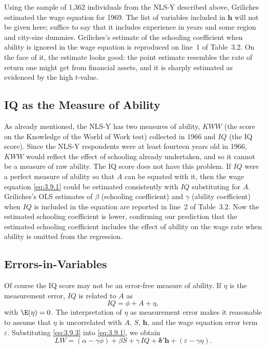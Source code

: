 Using the sample of 1,362 individuals from the NLS-Y described above,
Griliches estimated the wage equation for 1969.  The list of variables included in
$\mathbf{h}$ will not be given here; suffice to say that it includes experience in years and some
region and city-size dummies.  Griliches's estimate of the schooling coefficient
when ability is ignored in the wage equation is reproduced on line~1 of Table~3.2.
On the face of it, the estimate looks good: the point estimate resembles the rate of
return one might get from financial assets, and it is sharply estimated as evidenced
by the high $t$-value.

\subsection*{IQ as the Measure of Ability}

As already mentioned, the NLS-Y has two measures of ability, $KWW$ (the score on
the Knowledge of the World of Work test) collected in 1966 and $IQ$ (the IQ score).
Since the NLS-Y respondents were at least fourteen years old in 1966, $KWW$ would
reflect the effect of schooling already undertaken, and so it cannot be a measure of
raw ability.  The IQ score does not have this problem.  If $IQ$ were a perfect measure
of ability so that $A$ can be equated with it, then the wage equation \eqref{eq:3.9.1}
could be estimated consistently with $IQ$ substituting for $A$.  Griliches's OLS estimates
of $\beta$ (schooling coefficient) and $\gamma$ (ability coefficient) when $IQ$ is included in
the equation are reported in line~2 of Table~3.2.  Now the estimated schooling coefficient
is lower, confirming our prediction that the estimated schooling coefficient includes
the effect of ability on the wage rate when ability is omitted from the regression.

\subsection*{Errors-in-Variables}

Of course the IQ score may not be an error-free measure of ability.  If $\eta$ is the
measurement error, $IQ$ is related to $A$ as
\begin{equation}
  IQ = \phi + A + \eta,
  \label{eq:3.9.3}
\end{equation}
with $\E(\eta) = 0$.  The interpretation of $\eta$ as measurement error makes it reasonable
to assume that $\eta$ is uncorrelated with $A$, $S$, $\mathbf{h}$, and the wage equation error term
$\varepsilon$.  Substituting \eqref{eq:3.9.3} into \eqref{eq:3.9.1}, we obtain
\begin{equation}
  LW = (\alpha - \gamma\phi) + \beta S + \gamma\, IQ + \boldsymbol{\delta}'\mathbf{h}
  + (\varepsilon - \gamma\eta).
  \label{eq:3.9.4}
\end{equation}

